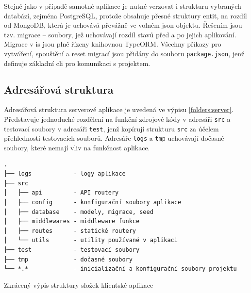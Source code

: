 Stejně jako v případě samotné aplikace je nutné verzovat i strukturu vybraných databází, zejména PostgreSQL, protože obsahuje přesné struktury entit, na rozdíl od MongoDB, která je uchovává převážně ve volném \gls{json} objektu. Řešením jsou tzv. migrace -- soubory, jež uchovávají rozdíl stavů před a po jejich aplikování. Migrace v \gls{is} jsou plně řízeny knihovnou TypeORM. Všechny příkazy pro vytváření, spouštění a reset migrací jsou přidány do souboru \texttt{package.json}, jenž definuje základní \gls{cli} pro komunikaci s projektem.





\subsection{Adresářová struktura}

Adresářová struktura serverové aplikace je uvedená ve výpisu \ref{folders:server}. Představuje jednoduché rozdělení na funkční zdrojové kódy v adresáři \texttt{src} a testovací soubory v adresáři \texttt{test}, jenž kopírují strukturu \texttt{src} za účelem přehlednosti testovacích souborů. Adresáře \texttt{logs} a \texttt{tmp} uchovávají dočasné soubory, které nemají vliv na funkčnost aplikace.

\begin{fig:code}
   \begin{verbatim}
.
├── logs            - logy aplikace
├── src
│   ├── api         - API routery
│   ├── config      - konfigurační soubory aplikace
│   ├── database    - modely, migrace, seed
│   ├── middlewares - middleware funkce
│   ├── routes      - statické routery
│   └── utils       - utility používané v aplikaci
├── test            - testovací soubory
├── tmp             - dočasné soubory
└── *.*             - inicializační a konfigurační soubory projektu
   \end{verbatim}
   \caption{Zkrácený výpis struktury složek klientské aplikace}\label{folders:server}
\end{fig:code}





